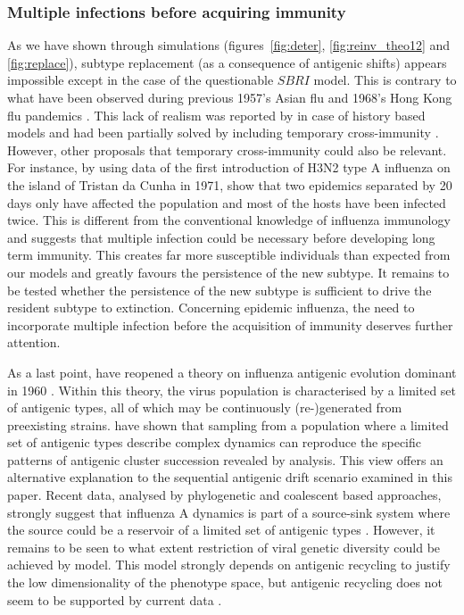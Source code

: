\subsubsection{Multiple infections before acquiring immunity}

As we have shown through simulations (figures~\ref{fig:deter},
\ref{fig:reinv_theo12} and \ref{fig:replace}), subtype replacement (as
a consequence of antigenic shifts) appears impossible except in the
case of the questionable $SBRI$ model. This is contrary to what have
been observed during previous 1957's Asian flu and 1968's Hong Kong
flu pandemics \citep{Earn2000}. This lack of realism was reported by
\citet{Ferguson2003} in case of history based models and had been
partially solved by including temporary cross-immunity
\citep{Webster1992}. However, other proposals that temporary
cross-immunity could also be relevant. For instance, by using data of
the first introduction of H3N2 type A influenza on the island of
Tristan da Cunha in 1971, \citet{Mathews2007} show that two epidemics
separated by 20 days only have affected the population and most of the
hosts have been infected twice. This is different from the
conventional knowledge of influenza immunology and suggests that
multiple infection could be necessary before developing long term
immunity. This creates far more susceptible individuals than expected
from our models and greatly favours the persistence of the new
subtype. It remains to be tested whether the persistence of the new
subtype is sufficient to drive the resident subtype to extinction.
Concerning epidemic influenza, the need to incorporate multiple
infection before the acquisition of immunity deserves further
attention.
\\

\vspace{1cm}

As a last point, \citet{Recker2007} have reopened a theory on
influenza antigenic evolution dominant in 1960 \citep{Francis1960}.
Within this theory, the virus population is characterised by a limited
set of antigenic types, all of which may be continuously
(re-)generated from preexisting strains. \citet{Recker2007} have shown
that sampling from a population where a limited set of antigenic types
describe complex dynamics can reproduce the specific patterns of
antigenic cluster succession revealed by \citet{Smith2004} analysis.
This view offers an alternative explanation to the sequential
antigenic drift scenario examined in this paper. Recent data, analysed
by phylogenetic and coalescent based approaches, strongly suggest that
influenza A dynamics is part of a source-sink system where the source
could be a reservoir of a limited set of antigenic types
\citep{Alonso2007a, Nelson2007b, Holmes2005, Nelson2006, Viboud2006,
  Rambaut2008, Russell2008}. However, it remains to be seen to what
extent restriction of viral genetic diversity could be achieved by
\citet{Recker2007} model. This model strongly depends on antigenic
recycling to justify the low dimensionality of the phenotype space,
but antigenic recycling does not seem to be supported by current data
\citep{Minayev2008, Minayev2009}.\\

